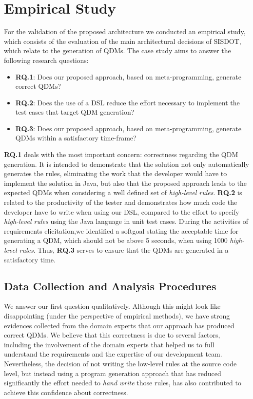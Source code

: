 \documentclass{bmcart}
\newcommand{\callers}{\emph{high-level rules}\xspace}
\begin{document}
\section*{Empirical Study}
\label{sec:case_study} 
For the validation of the proposed architecture we conducted an empirical study, which consists of the evaluation of the main architectural decisions of SISDOT, which relate to the generation of QDMs. The case study aims to answer the following research questions:

\begin{itemize}
	\item \textbf{RQ.1}: Does our proposed approach, based on meta-programming, generate correct QDMs?
	\item \textbf{RQ.2}: Does the use of a DSL reduce the effort necessary to implement the test cases that target QDM generation? 
	\item \textbf{RQ.3}: Does our proposed approach, based on meta-programming, generate QDMs within a satisfactory time-frame?
\end{itemize}

\textbf{RQ.1} deals with the most important concern: correctness regarding the QDM generation. It is intended to demonstrate that the solution not only automatically generates the rules, eliminating the work that the developer would have to implement the solution in Java, but also that the proposed approach leads to the expected QDMs when considering a well defined set of \callers. \textbf{RQ.2} is related to the productivity of the tester and demonstrates how much code the developer have to write when using our DSL, compared to the effort to specify \callers using the Java language in unit test cases. During the activities of requirements elicitation,we identified a softgoal stating the  acceptable time for generating a QDM, which should not be above 5 seconds, when using 1000 \callers. Thus, \textbf{RQ.3} serves to ensure that the QDMs are generated in a satisfactory time.



\subsection*{Data Collection and Analysis Procedures}
We answer our first question qualitatively. Although this might look like disappointing (under the perspective of empirical methods), we have strong evidences collected from the domain experts that our approach has produced correct QDMs. We believe that this correctness is due to several factors, including the involvement of the domain experts that helped us to full understand the requirements and the expertise of our development team. Nevertheless, the decision of not writing the low-level rules at the source code level, but instead using a program generation approach that has reduced significantly the effort needed to \emph{hand write} 
those rules, has also contributed to achieve this confidence about correctness. 
\end{document}
